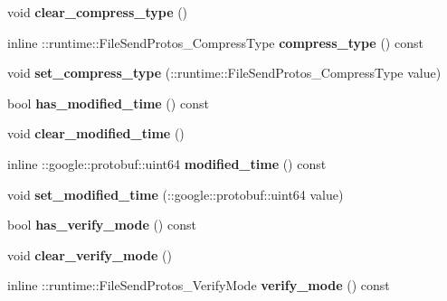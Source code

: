 \begin{DoxyCompactItemize}
void {\bfseries clear\+\_\+compress\+\_\+type} ()
\item 
\mbox{\label{classruntime_1_1FileSendProtos_a97a3c4629a4404607b877015e064668b}} 
inline \+::runtime\+::\+File\+Send\+Protos\+\_\+\+Compress\+Type {\bfseries compress\+\_\+type} () const
\item 
\mbox{\label{classruntime_1_1FileSendProtos_ae514ed720bd878ea71312024c7ed5ef7}} 
void {\bfseries set\+\_\+compress\+\_\+type} (\+::runtime\+::\+File\+Send\+Protos\+\_\+\+Compress\+Type value)
\item 
\mbox{\label{classruntime_1_1FileSendProtos_a4f679752bb0b3b3f7aa09245f7744712}} 
bool {\bfseries has\+\_\+modified\+\_\+time} () const
\item 
\mbox{\label{classruntime_1_1FileSendProtos_ac48b3c614c6ddc43a05b668e23eb6d8f}} 
void {\bfseries clear\+\_\+modified\+\_\+time} ()
\item 
\mbox{\label{classruntime_1_1FileSendProtos_a9be3d32ba58cb81014d72e7ecead9b45}} 
inline \+::google\+::protobuf\+::uint64 {\bfseries modified\+\_\+time} () const
\item 
\mbox{\label{classruntime_1_1FileSendProtos_a93d03cc850cc8a2126ec5b3e57421634}} 
void {\bfseries set\+\_\+modified\+\_\+time} (\+::google\+::protobuf\+::uint64 value)
\item 
\mbox{\label{classruntime_1_1FileSendProtos_acf9bc19bc21c9b5a4010090cd3025be0}} 
bool {\bfseries has\+\_\+verify\+\_\+mode} () const
\item 
\mbox{\label{classruntime_1_1FileSendProtos_a45d4389af6192915e9e643138ef8f092}} 
void {\bfseries clear\+\_\+verify\+\_\+mode} ()
\item 
\mbox{\label{classruntime_1_1FileSendProtos_ae2d91e0ac2818115173fd8421a1cb099}} 
inline \+::runtime\+::\+File\+Send\+Protos\+\_\+\+Verify\+Mode {\bfseries verify\+\_\+mode} () const
\item 

\end{DoxyCompactItemize}

